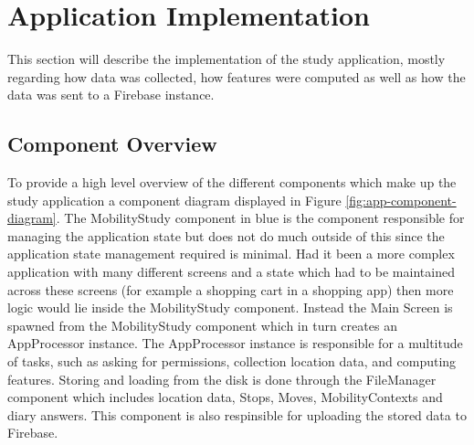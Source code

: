 \section{Application Implementation}
This section will describe the implementation of the study application, mostly regarding how data was collected, how features were computed as well as how the data was sent to a Firebase instance. 

\subsection{Component Overview}
To provide a high level overview of the different components which make up the study application a component diagram displayed in Figure \ref{fig:app-component-diagram}. The MobilityStudy component in blue is the component responsible for managing the application state but does not do much outside of this since the application state management required is minimal. Had it been a more complex application with many different screens and a state which had to be maintained across these screens (for example a shopping cart in a shopping app) then more logic would lie inside the MobilityStudy component. Instead the Main Screen is spawned from the MobilityStudy component which in turn creates an AppProcessor instance. The AppProcessor instance is responsible for a multitude of tasks, such as asking for permissions, collection location data, and computing features. Storing and loading from the disk is done through the FileManager component which includes location data, Stops, Moves, MobilityContexts and diary answers. This component is also respinsible for uploading the stored data to Firebase.

